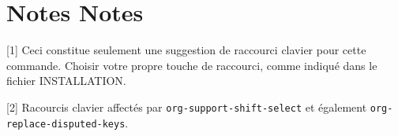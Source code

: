 
\section{Notes Notes}
[1] Ceci constitue seulement une suggestion de raccourci clavier pour cette commande. Choisir votre propre touche de raccourci, comme indiqu\'e dans le fichier INSTALLATION.

[2] Racourcis clavier affect\'es par {\tt org-support-shift-select} et \'egalement  {\tt org-replace-disputed-keys}.

\copyrightnotice

\bye




